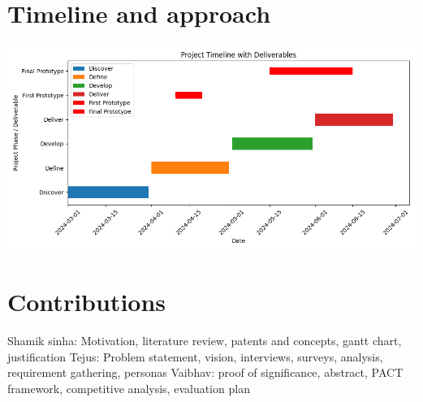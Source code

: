 \documentclass[manuscript,screen,review]{acmart}
\begin{document}
\section{Timeline and approach}

\includegraphics[width=6.26806in,height=2.63889in]{gantt chart.png}

\section{Contributions}
Shamik sinha: Motivation, literature review, patents and concepts, gantt chart, justification
\newline
Tejus: Problem statement, vision, interviews, surveys, analysis, requirement gathering, personas
\newline
Vaibhav: proof of significance, abstract, PACT framework, competitive analysis, evaluation plan





\appendix
\end{document}
